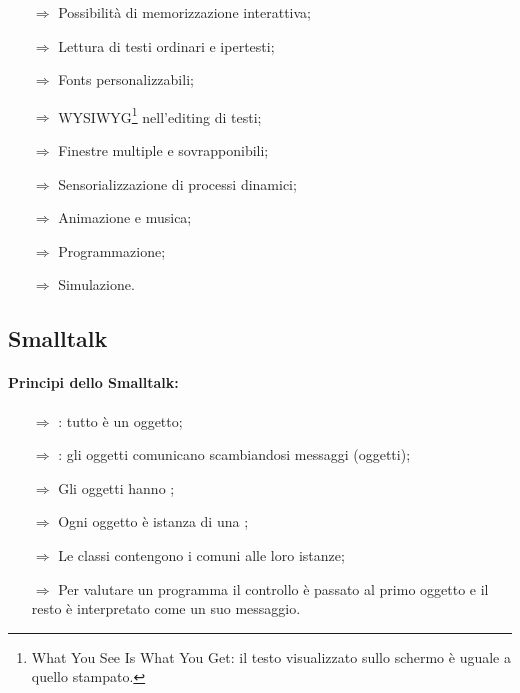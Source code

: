 \begin{itemize}
    \item [$\Rightarrow$] Possibilità di memorizzazione interattiva;
    \item [$\Rightarrow$] Lettura di testi ordinari e ipertesti;
    \item [$\Rightarrow$] Fonts personalizzabili;
    \item [$\Rightarrow$] WYSIWYG\footnote{
        What You See Is What You Get: il testo visualizzato sullo schermo è uguale a quello stampato.
    } nell'editing di testi;
    \item [$\Rightarrow$] Finestre multiple e sovrapponibili;
    \item [$\Rightarrow$] Sensorializzazione di processi dinamici;
    \item [$\Rightarrow$] Animazione e musica;
    \item [$\Rightarrow$] Programmazione;
    \item [$\Rightarrow$] Simulazione.
\end{itemize}



\subsection{Smalltalk}


\paragraph{Principi dello Smalltalk:}

\begin{itemize}
    \item [$\Rightarrow$] : tutto è un oggetto;
    \item [$\Rightarrow$] : gli oggetti comunicano scambiandosi messaggi (oggetti);
    \item [$\Rightarrow$] Gli oggetti hanno ;
    \item [$\Rightarrow$] Ogni oggetto è istanza di una ;
    \item [$\Rightarrow$] Le classi contengono i  comuni alle loro istanze;
    \item [$\Rightarrow$] Per valutare un programma il controllo è passato al primo oggetto e il resto è 
    interpretato come un suo messaggio.
\end{itemize}

